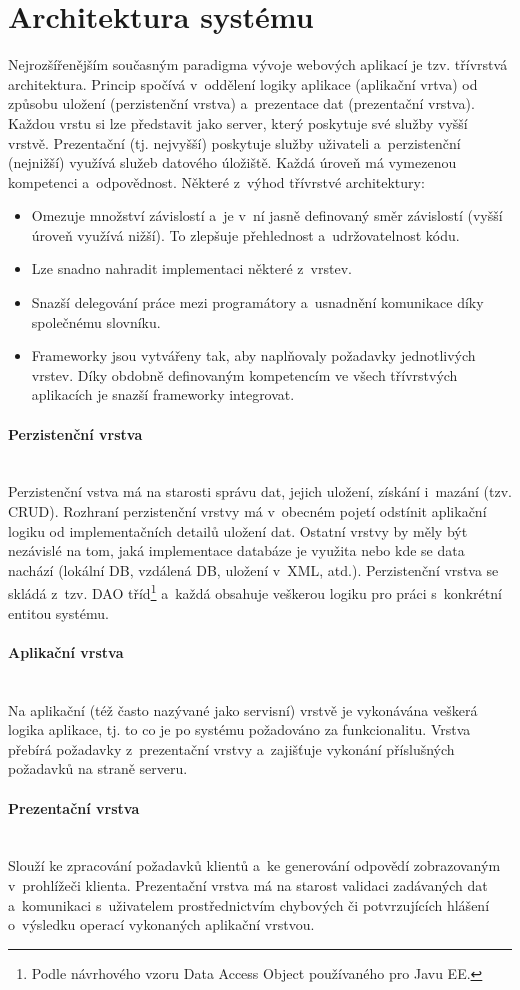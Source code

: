 \documentclass[11pt, final, oneside]{fithesis2}
\newcommand{\paragraphNewLine}[1]{\paragraph*{#1}\mbox{}\\}
\begin{document}
\section{Architektura systému}
Nejrozšířenějším současným paradigma vývoje webových aplikací je tzv. třívrstvá architektura. Princip spočívá v~oddělení logiky aplikace (aplikační vrtva) od způsobu uložení (perzistenční vrstva) a~prezentace dat (prezentační vrstva). Každou vrstu si lze představit jako server, který poskytuje své služby vyšší vrstvě. Prezentační (tj. nejvyšší) poskytuje služby uživateli a~perzistenční (nejnižší) využívá služeb datového úložiště. Každá úroveň má vymezenou kompetenci a~odpovědnost.
Některé z~výhod třívrstvé architektury:
\begin{itemize}
	\item Omezuje množství závislostí a~je v~ní jasně definovaný směr závislostí (vyšší úroveň využívá nižší). To zlepšuje přehlednost a~udržovatelnost kódu.
	\item Lze snadno nahradit implementaci některé z~vrstev.
	\item Snazší delegování práce mezi programátory a~usnadnění komunikace díky společnému slovníku.
	\item Frameworky jsou vytvářeny tak, aby naplňovaly požadavky jednotlivých vrstev. Díky obdobně definovaným kompetencím ve všech třívrstvých aplikacích je snazší frameworky integrovat.
\end{itemize}

\paragraphNewLine{Perzistenční vrstva}
Perzistenční vstva má na starosti správu dat, jejich uložení, získání i~mazání (tzv. CRUD). Rozhraní perzistenční vrstvy má v~obecném pojetí odstínit aplikační logiku od implementačních detailů uložení dat. Ostatní vrstvy by měly být nezávislé na tom, jaká implementace databáze je využita nebo kde se data nachází (lokální DB, vzdálená DB, uložení v~XML, atd.).
Perzistenční vrstva se skládá z~tzv. DAO tříd\footnote{Podle návrhového vzoru Data Access Object používaného pro Javu EE.} a~každá obsahuje veškerou logiku pro práci s~konkrétní entitou systému.

\paragraphNewLine{Aplikační vrstva} 
Na aplikační (též často nazývané jako servisní) vrstvě je vykonávána veškerá logika aplikace, tj. to co je po systému požadováno za funkcionalitu. Vrstva přebírá požadavky z~prezentační vrstvy a~zajišťuje vykonání příslušných požadavků na straně serveru. 

\paragraphNewLine{Prezentační vrstva} 
Slouží ke zpracování požadavků klientů a~ke generování odpovědí zobrazovaným v~prohlížeči klienta. Prezentační vrstva má na starost validaci zadávaných dat a~komunikaci s~uživatelem prostřednictvím chybových či potvrzujících hlášení o~výsledku operací vykonaných aplikační vrstvou. 
\end{document}
